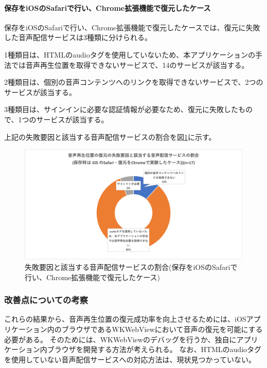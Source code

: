 \paragraph{保存をiOSのSafariで行い、Chrome拡張機能で復元したケース}
保存をiOSのSafariで行い、Chrome拡張機能で復元したケースでは、復元に失敗した音声配信サービスは3種類に分けられる。

1種類目は、HTMLのaudioタグを使用していないため、本アプリケーションの手法では音声再生位置を取得できないサービスで、14のサービスが該当する。

2種類目は、個別の音声コンテンツへのリンクを取得できないサービスで、2つのサービスが該当する。

3種類目は、サインインに必要な認証情報が必要なため、復元に失敗したもので、1つのサービスが該当する。

上記の失敗要因と該当する音声配信サービスの割合を図\ref{fig:evl-consideration-audio-cause-ratio-ios-chrome}に示す。

\begin{figure}[htbp]
  \label{fig:evl-consideration-audio-cause-ratio-ios-chrome}
  \begin{center}
    \includegraphics[bb=0 0 712.88888889 362.44444444,width=15cm]{img/060_evaluation/consideration/audio/cause-ratio-ios-chrome.pdf}
  \end{center}
  \caption{失敗要因と該当する音声配信サービスの割合(保存をiOSのSafariで行い、Chrome拡張機能で復元したケース)}
\end{figure}

\subsubsection{改善点についての考察}
これらの結果から、音声再生位置の復元成功率を向上させるためには、iOSアプリケーション内のブラウザであるWKWebViewにおいて音声の復元を可能にする必要がある。
そのためには、WKWebViewのデバッグを行うか、独自にアプリケーション内ブラウザを開発する方法が考えられる。
なお、HTMLのaudioタグを使用していない音声配信サービスへの対応方法は、現状見つかっていない。